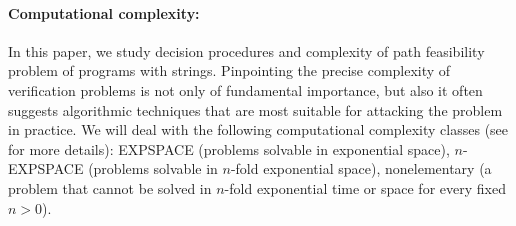 
\paragraph{Computational complexity:} In this paper, we study decision procedures and complexity of path feasibility problem of programs with strings. 
Pinpointing the precise complexity of verification problems is not only of fundamental
importance, but also it often suggests algorithmic techniques
that are most suitable for attacking the problem in practice.
We will deal with the following computational complexity
classes (see \cite{1994-papadimitriou} for more details): EXPSPACE (problems solvable
in exponential space), $n$-EXPSPACE (problems solvable in $n$-fold exponential space), nonelementary (a problem that cannot be solved in $n$-fold exponential
time or space for every fixed $n > 0$).


 
 
